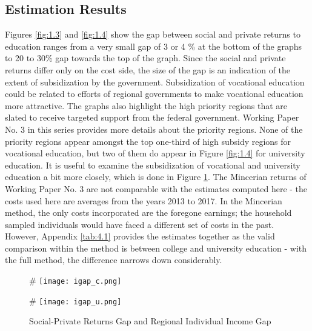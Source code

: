 \documentclass[alpha-refs]{wiley-article-05g}
\begin{document}
\vspace{-2em}

\subsection{Estimation Results} 

Figures \ref{fig:1.3} and \ref{fig:1.4} show the gap between social and private returns to education ranges from a very small gap of 3 or 4 \% at the bottom of the graphs to 20 to 30\% gap towards the top of the graph. Since the social and private returns differ only on the cost side, the size of the gap is an indication of the extent of subsidization by the government. Subsidization of vocational education could be related to efforts of regional governments to make vocational education more attractive. The graphs also highlight the high priority regions that are slated to receive targeted support from the federal government. Working Paper No. 3 in this series provides more details about the priority regions. None of the priority regions appear amongst the top one-third of high subsidy regions for vocational education, but two of them do appear in Figure \ref{fig:1.4} for university education. It is useful to examine the subsidization of vocational and university education a bit more closely, which is done in Figure \ref{fig:1.5}. The Mincerian returns of Working Paper No. 3 are not comparable with the estimates computed here - the costs used here are averages from the years 2013 to 2017. In the Mincerian method, the only costs incorporated are the foregone earnings; the household sampled individuals would have faced a different set of costs in the past. However, Appendix \ref{tab:4.1} provides the estimates together as the valid comparison within the method is between college and university education - with the full method, the difference narrows down considerably. 

\begin{figure}[htbp!]
	\begin{minipage}[b]{.5\linewidth}
		\centering
		#\hspace*{-0.2in}
		\texttt{[image: igap\_c.png]}
	\end{minipage}
	\hfill
	\begin{minipage}[b]{.5\linewidth}
		\centering
		#\hspace*{-0.2in}
		\texttt{[image: igap\_u.png]}
	\end{minipage}
	\caption{Social-Private Returns Gap and Regional Individual Income Gap}\label{fig:1.5}
\end{figure}
\end{document}
